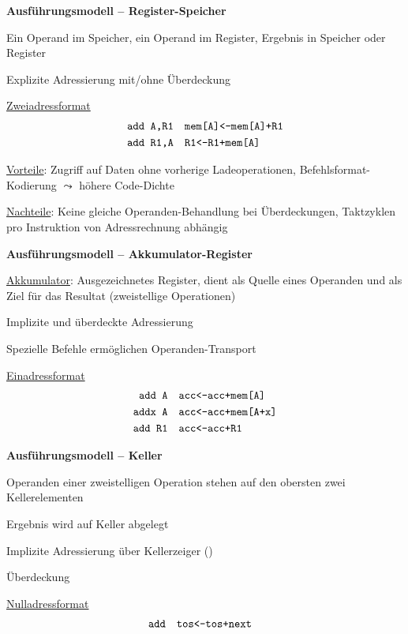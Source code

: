 \textbf{Ausführungsmodell -- Register-Speicher}
\begin{items}
	\item Ein Operand im Speicher, ein Operand im Register, Ergebnis in Speicher oder Register
	\item Explizite Adressierung mit/ohne Überdeckung
	\item \underline{Zweiadressformat}
	\begin{align*}
		\text{\code{add A,R1}} &\quad \text{\code{mem[A]<-mem[A]+R1}} \\
		\text{\code{add R1,A}} &\quad \text{\code{R1<-R1+mem[A]}}
	\end{align*}
	\item \underline{Vorteile}: Zugriff auf Daten ohne vorherige Ladeoperationen, Befehlsformat-Kodierung $\leadsto$ höhere Code-Dichte
	\item \underline{Nachteile}: Keine gleiche Operanden-Behandlung bei Überdeckungen, Taktzyklen pro Instruktion von Adressrechnung abhängig
\end{items}

\newpage

\textbf{Ausführungsmodell -- Akkumulator-Register}
\begin{items}
	\item \underline{Akkumulator}: Ausgezeichnetes Register, dient als Quelle eines Operanden und als Ziel für das Resultat (zweistellige Operationen)
	\item Implizite und überdeckte Adressierung
	\item Spezielle Befehle ermöglichen Operanden-Transport
	\item \underline{Einadressformat}
	\begin{align*}
		\text{\code{add A}} &\quad \text{\code{acc<-acc+mem[A]}} \\
		\text{\code{addx A}} &\quad \text{\code{acc<-acc+mem[A+x]}} \\
		\text{\code{add R1}} &\quad \text{\code{acc<-acc+R1}}
	\end{align*}
\end{items}

\textbf{Ausführungsmodell -- Keller}
\begin{items}
	\item Operanden einer zweistelligen Operation stehen auf den obersten zwei Kellerelementen
	\item Ergebnis wird auf Keller abgelegt
	\item Implizite Adressierung über Kellerzeiger ()
	\item Überdeckung
	\item \underline{Nulladressformat}
	\begin{align*}
		\text{\code{add}} &\quad \text{\code{tos<-tos+next}}
	\end{align*}
\end{items}

